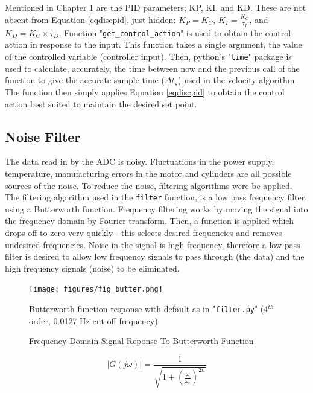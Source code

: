 \documentclass[twoside,a4]{report}
\def\br{\newline \newline \noindent}
\begin{document}
	\noindent
	Mentioned in Chapter 1 are the PID parameters; KP, KI, and KD. These are not absent from Equation \ref{eqdiscpid}, just hidden: \(K_P = K_C\), \(K_I = \frac{K_C}{\tau _I}\), and \(K_D = K_C \times \tau_D\).\br
	Function "\texttt{get\_control\_action}" is used to obtain the control action in response to the input. This function takes a single argument, the value of the controlled variable (controller input). Then, python's "\texttt{time}" package is used to calculate, accurately, the time between now and the previous call of the function to give the accurate sample time (\(\Delta t_s\)) used in the velocity algorithm. The function then simply applies Equation \ref{eqdiscpid} to obtain the control action best suited to maintain the desired set point.
	
	\subsection*{Noise Filter} %
	The data read in by the ADC is noisy. Fluctuations in the power supply, temperature, manufacturing errors in the motor and cylinders are all possible sources of the noise. To reduce the noise, filtering algorithms were be applied. \br
	The filtering algorithm used in the \texttt{filter} function, is a low pass frequency filter, using a Butterworth function. Frequency filtering works by moving the signal into the frequency domain by Fourier transform. Then, a function is applied which drops off to zero very quickly - this selects desired frequencies and removes undesired frequencies. Noise in the signal is high frequency, therefore a low pass filter is desired to allow low frequency signals to pass through (the data) and the high frequency signals (noise) to be eliminated.\br	\begin{figure}[!htb]
		\centering
		\texttt{[image: figures/fig\_butter.png]}
		\caption{Frequency Domain Signal Reponse To Butterworth Function}
		\label{figbutter}
		\footnotesize Butterworth function response with default as in "\texttt{filter.py}" (4$^{th}$ order, 0.0127 Hz cut-off frequency).
	\end{figure}\noindent
	\begin{equation}
	|G(j\omega)| = \frac{1}{\sqrt{1 + \left(\frac{\omega}{\omega_c}\right)^{2n}}}
	\label{eqnbuttgain}
	\end{equation}
	
\end{document}
